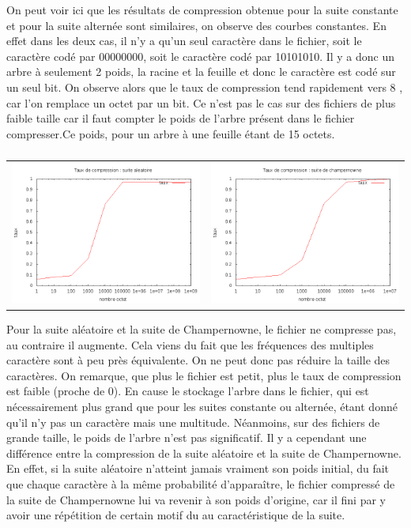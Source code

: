 \documentclass{report}
\begin{document}
On peut voir ici que les  résultats de compression obtenue pour la suite constante et pour la suite alternée sont similaires, on observe des courbes constantes. En effet dans les deux cas, il n'y a qu'un seul caractère dans le fichier, soit le caractère codé par 00000000, soit le caractère codé par 10101010. Il y a donc un arbre à seulement 2 poids, la racine et la feuille et donc le caractère est codé sur un seul bit. On observe alors que le taux de compression tend rapidement vers 8 , car l'on remplace un octet par un bit. Ce n'est pas le cas sur des fichiers de plus faible taille car il faut compter le poids de l'arbre présent dans le fichier compresser.Ce poids, pour un arbre à une feuille étant de 15 octets.
\subparagraph*{}
\hspace{-2cm}\begin{tabular}{l | l}
\includegraphics[width=7cm]{aleaH.png} & 
\includegraphics[width=7cm]{champH.png}
\end{tabular}
Pour la suite aléatoire et la suite de Champernowne, le fichier ne compresse pas, au contraire il augmente. Cela viens du fait que les fréquences des multiples caractère sont à peu près équivalente. On ne peut donc pas réduire la taille des caractères. On remarque, que plus le fichier est petit, plus le taux de compression est faible (proche de 0). En cause le stockage l'arbre dans le fichier, qui est nécessairement plus grand que pour les suites constante ou alternée, étant donné qu'il n'y pas un caractère mais une multitude. Néanmoins, sur des fichiers de grande taille, le poids de l'arbre n'est pas significatif. 
Il y a cependant une différence entre la compression de la suite aléatoire et la suite de Champernowne. En effet, si la suite aléatoire n'atteint jamais vraiment son poids initial, du fait que chaque caractère à la même probabilité d'apparaître, le fichier compressé de la suite de Champernowne lui va revenir à son poids d'origine, car il fini par y avoir une répétition de certain motif du au caractéristique de la suite.
\end{document}
